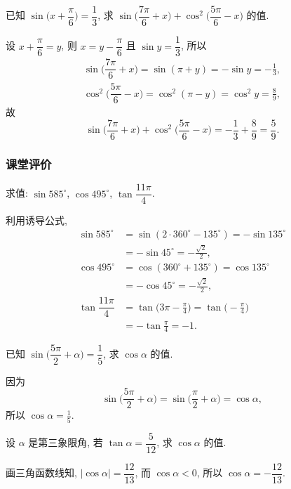 \begin{exercise}
    已知 $\sin\biggl(x+\dfrac\pi6\biggr)= \dfrac13$, 
    求 $\sin\biggl(\dfrac{7\pi}6+x\biggr)+ 
      \cos^2\biggl(\dfrac{5\pi}6-x\biggr)$ 的值.
\end{exercise}
\beginsolution
    设 $x+\dfrac\pi6=y$, 则 $x=y-\dfrac\pi6$ 且 $\sin y= \dfrac13$, 所以
    \[\begin{aligned}
        \sin\biggl(\dfrac{7\pi}6+x\biggr)
        = \sin(\pi+y)= -\sin y= -\frac13,\\
        \cos^2\biggl(\dfrac{5\pi}6-x\biggr)
        = \cos^2(\pi-y)= \cos^2y= \frac89,
    \end{aligned}\]
    故
    \[\sin\biggl(\dfrac{7\pi}6+x\biggr)+ 
    \cos^2\biggl(\dfrac{5\pi}6-x\biggr)
        = -\frac13+ \frac89= \frac59.\]
\endsolution

\subsubsection{课堂评价}

\begin{exercise}
    求值: $\sin 585^\circ$, $\cos 495^\circ$, $\tan\dfrac{11\pi}4$.
\end{exercise}
\beginsolution
    利用诱导公式,
    \[\begin{aligned}
        \sin 585^\circ
        &= \sin (2\cdot360^\circ- 135^\circ)
         = -\sin 135^\circ\\
        &= -\sin45^\circ= -\frac{\sqrt2}{2},\\
        \cos 495^\circ
        &= \cos(360^\circ+ 135^\circ)= \cos135^\circ\\
        &= -\cos45^\circ= -\frac{\sqrt2}{2},\\
        \tan\dfrac{11\pi}4
        &= \tan\biggl(3\pi-\frac\pi4\biggr)
         = \tan\biggl(-\frac\pi4\biggr)\\
        &= -\tan\frac\pi4= -1.
    \end{aligned}\]
\endsolution

\begin{exercise}
    已知 $\sin\biggl(\dfrac{5\pi}2+ \alpha\biggr)= \dfrac15$, 
    求 $\cos\alpha$ 的值.
\end{exercise}
\beginsolution
    因为 
    \[\sin\biggl(\dfrac{5\pi}2+ \alpha\biggr)
        = \sin\biggl(\dfrac{\pi}2+ \alpha\biggr)
        = \cos\alpha,\]
    所以 $\cos\alpha= \frac15$.
\endsolution

\begin{exercise}
    设 $\alpha$ 是第三象限角, 若 $\tan\alpha =\dfrac5{12}$, 
    求 $\cos\alpha $ 的值.
\end{exercise}
\beginsolution
    画三角函数线知, $|\cos\alpha|= \dfrac{12}{13}$, 而 $\cos\alpha<0$, 所以 $\cos\alpha= -\dfrac{12}{13}$.
\endsolution


